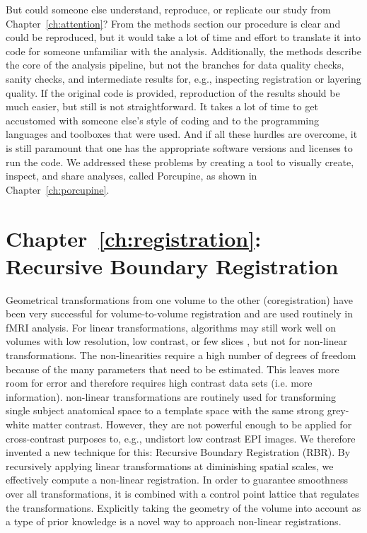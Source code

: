 But could someone else understand, reproduce, or replicate our study from Chapter~\ref{ch:attention}? From the methods section our procedure is clear and could be reproduced, but it would take a lot of time and effort to translate it into code for someone unfamiliar with the analysis. Additionally, the methods describe the core of the analysis pipeline, but not the branches for data quality checks, sanity checks, and intermediate results for, e.g., inspecting registration or layering quality. If the original code is provided, reproduction of the results should be much easier, but still is not straightforward. It takes a lot of time to get accustomed with someone else's style of coding and to the programming languages and toolboxes that were used. And if all these hurdles are overcome, it is still paramount that one has the appropriate software versions and licenses to run the code. We addressed these problems by creating a tool to visually create, inspect, and share analyses, called Porcupine, as shown in Chapter~\ref{ch:porcupine}.

\section*{Chapter~\ref{ch:registration}: Recursive Boundary Registration}
Geometrical transformations from one volume to the other (coregistration) have been very successful for volume-to-volume registration and are used routinely in fMRI analysis. For linear transformations, algorithms may still work well on volumes with low resolution, low contrast, or few slices \cite{Greve201}, but not for non-linear transformations. The non-linearities require a high number of degrees of freedom because of the many parameters that need to be estimated. This leaves more room for error and therefore requires high contrast data sets (i.e. more information). non-linear transformations are routinely used for transforming single subject anatomical space to a template space with the same strong grey-white matter contrast. However, they are not powerful enough to be applied for cross-contrast purposes to, e.g., undistort low contrast EPI images. We therefore invented a new technique for this: Recursive Boundary Registration (RBR). By recursively applying linear transformations at diminishing spatial scales, we effectively compute a non-linear registration. In order to guarantee smoothness over all transformations, it is combined with a control point lattice that regulates the transformations. Explicitly taking the geometry of the volume into account as a type of prior knowledge is a novel way to approach non-linear registrations.

